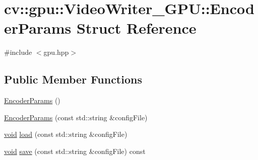 \hypertarget{structcv_1_1gpu_1_1VideoWriter__GPU_1_1EncoderParams}{\section{cv\-:\-:gpu\-:\-:Video\-Writer\-\_\-\-G\-P\-U\-:\-:Encoder\-Params Struct Reference}
\label{structcv_1_1gpu_1_1VideoWriter__GPU_1_1EncoderParams}
}


{\ttfamily \#include $<$gpu.\-hpp$>$}

\subsection*{Public Member Functions}
\begin{DoxyCompactItemize}
\item 
\hyperlink{structcv_1_1gpu_1_1VideoWriter__GPU_1_1EncoderParams_ac6403ce2c85b153e57b344e06a699947}{Encoder\-Params} ()
\item 
\hyperlink{structcv_1_1gpu_1_1VideoWriter__GPU_1_1EncoderParams_ac087b9a5755f5a1134b7f0bc66396ece}{Encoder\-Params} (const std\-::string \&config\-File)
\item 
\hyperlink{legacy_8hpp_a8bb47f092d473522721002c86c13b94e}{void} \hyperlink{structcv_1_1gpu_1_1VideoWriter__GPU_1_1EncoderParams_a042642bf72e282fe922043ef5cff5985}{load} (const std\-::string \&config\-File)
\item 
\hyperlink{legacy_8hpp_a8bb47f092d473522721002c86c13b94e}{void} \hyperlink{structcv_1_1gpu_1_1VideoWriter__GPU_1_1EncoderParams_a63fcef4ac953f3bf7c92206a61197c21}{save} (const std\-::string \&config\-File) const 
\end{DoxyCompactItemize}
